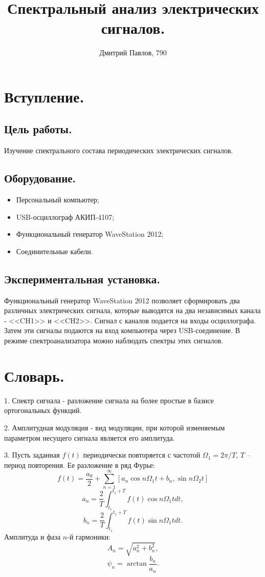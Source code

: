 \documentclass[12pt,a4paper]{article}
\author{Дмитрий Павлов, 790}
\title {\textbf{Спектральный анализ электрических сигналов.}}
\begin{document}
\maketitle
\newpage
\tableofcontents 

\newpage

\section{Вступление.}
    \subsection{Цель работы.}
        Изучение спектрального состава периодических электрических сигналов.
        
    \subsection{Оборудование.}
        \begin{itemize}
            \item Персональный компьютер;
            \item USB-осциллограф АКИП-4107;
            \item Функциональный генератор WaveStation 2012;
            \item Соединительные кабели.
        \end{itemize}

    \subsection{Экспериментальная установка.}
        Функциональный генератор WaveStation 2012 позволяет сформировать два различных электрических сигнала, которые выводятся на два независимых канала - <<CH1>> и <<CH2>>. Сигнал с каналов подается на входы осциллографа. Затем эти сигналы подаются на вход компьютера через USB-соединение. В режиме спектроанализатора можно наблюдать спектры этих сигналов.

\section{Словарь.}
    1. Спектр сигнала - разложение сигнала на более простые в базисе ортогональных функций.
    
    2. Амплитудная модуляция - вид модуляции, при которой изменяемым параметром несущего сигнала является его амплитуда.
    
    3. Пусть заданная $f(t)$ периодически повторяется с частотой $\Omega_1 = 2\pi/T$, $T$ -- период повторения.
    Ее разложение в ряд Фурье:
    \[
    f(t) = \dfrac{a_0}{2} + \sum_{n=1}^{\infty} [a_n \cos{n\Omega_1 t} + b_n, \sin{n\Omega_2 t}]
    \]
    \[
    a_n = \dfrac{2}{T}\int_{t_1}^{t_1 + T} f(t) \cos{n\Omega_1 t}dt,
    \]
    \[
    b_n = \dfrac{2}{T}\int_{t_1}^{t_1 + T} f(t) \sin{n\Omega_1 t}dt.
    \]
    Амплитуда и фаза $n$-й гармоники:
    \[
    A_n = \sqrt{a_n^2 + b_n^2},
    \]
    \[
    \psi_n = \arctan{\dfrac{b_n}{a_n}}.
    \]
\newpage
\end{document}
